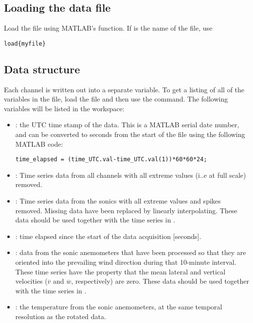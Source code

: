 \subsection{Loading the data file}
Load the file using MATLAB's  function. If  is the name of the file, use

\begin{lstlisting}
load{myfile}
\end{lstlisting}

\subsection{Data structure}
Each channel is written out into a separate variable. To get a listing of all of the variables in the file, load the file and then use the  command. The following variables will be listed in the workspace:
\begin{itemize}
\item {}: the UTC time stamp of the data. This is a MATLAB serial date number, and can be converted to seconds from the start of the file using the following MATLAB code:

\begin{lstlisting}
time_elapsed = (time_UTC.val-time_UTC.val(1))*60*60*24;
\end{lstlisting}

\item {}: Time series data from all channels with all extreme values (i..e at full scale) removed.
\item {}: Time series data from the sonics with all extreme values and spikes removed. Missing data have been replaced by linearly interpolating. These data should be used together with the time series in .
\item {}: time elapsed since the start of the data acquisition [seconds].
\item {}: data from the sonic anemometers that have been processed so that they are oriented into the prevailing wind direction during that 10-minute interval. These time series have the property that the mean lateral and vertical velocities ($\overline{v}$ and $\overline{w}$, respectively) are zero. These data should be used together with the time series in .
\item {}: the temperature from the sonic anemometers, at the same temporal resolution as the rotated data.
\end{itemize}

